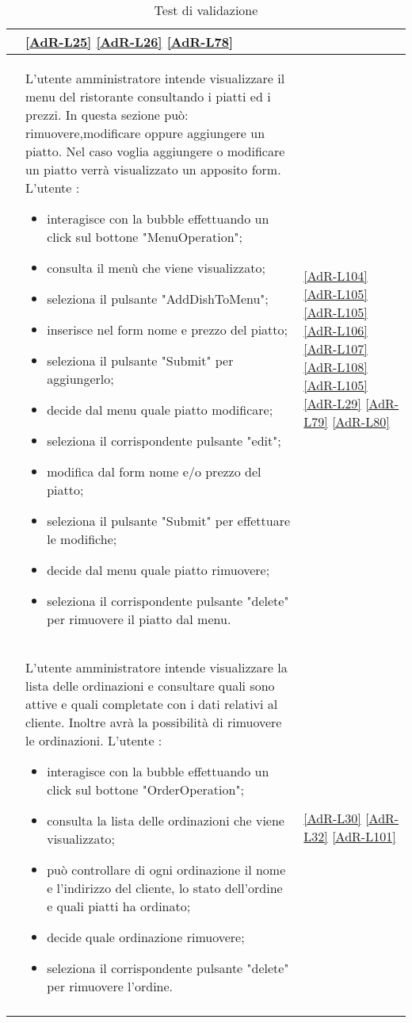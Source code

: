 \begin{longtable}{|c|P{9cm}|P{2.5cm}|}
	&\ref{AdR-L25} \ref{AdR-L26} \ref{AdR-L78}\\
	\hline {} & L'utente amministratore intende visualizzare il menu del ristorante consultando i piatti ed i prezzi. In questa sezione può: rimuovere,modificare oppure aggiungere un piatto.
	Nel caso voglia aggiungere o modificare un piatto verrà visualizzato un apposito form. L'utente :
	\begin{itemize}
		\item interagisce con la bubble effettuando un click sul bottone "MenuOperation";
		\item consulta il menù che viene visualizzato; 
		\item seleziona il pulsante "AddDishToMenu";
		\item inserisce nel form nome e prezzo del piatto;
		\item seleziona il pulsante "Submit" per aggiungerlo;
		\item decide dal menu quale piatto modificare;
		\item seleziona il corrispondente pulsante "edit";
		\item modifica dal form nome e/o prezzo del piatto;
		\item seleziona il pulsante "Submit" per effettuare le modifiche;
		\item decide dal menu quale piatto rimuovere;
		\item seleziona il corrispondente pulsante "delete" per rimuovere il piatto dal menu.
	\end{itemize}
	& \ref{AdR-L104} \ref{AdR-L105} \ref{AdR-L105} \ref{AdR-L106} \ref{AdR-L107} \ref{AdR-L108} \ref{AdR-L105} \ref{AdR-L29} \ref{AdR-L79} \ref{AdR-L80} \\
	\hline {} & L'utente amministratore intende visualizzare la lista delle ordinazioni e consultare quali sono attive e quali completate con i dati relativi al cliente. Inoltre avrà la possibilità di rimuovere le ordinazioni. L'utente :
	\begin{itemize}
		\item interagisce con la bubble effettuando un click sul bottone "OrderOperation";
		\item consulta la lista delle ordinazioni che viene visualizzato; 
		\item può controllare di ogni ordinazione il nome e l'indirizzo del cliente, lo stato dell'ordine e quali piatti ha ordinato;
		\item decide quale ordinazione rimuovere;
		\item seleziona il corrispondente pulsante "delete" per rimuovere l'ordine.
	\end{itemize}
	& \ref{AdR-L30} \ref{AdR-L32} \ref{AdR-L101} \\
	\hline
	\caption{Test di validazione \DemoName{}}
\end{longtable}

